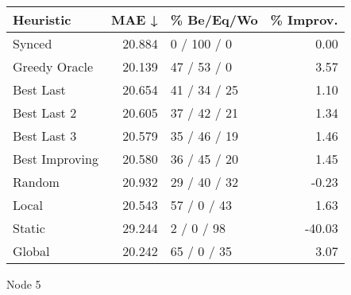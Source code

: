\begin{tabular}{lrlr}
\toprule
\textbf{Heuristic} & \textbf{MAE ↓} & \textbf{\% Be/Eq/Wo} & \textbf{\% Improv.} \\
\midrule
            Synced &         20.884 &          0 / 100 / 0 &                0.00 \\
     Greedy Oracle &         20.139 &          47 / 53 / 0 &                3.57 \\
         Best Last &         20.654 &         41 / 34 / 25 &                1.10 \\
       Best Last 2 &         20.605 &         37 / 42 / 21 &                1.34 \\
       Best Last 3 &         20.579 &         35 / 46 / 19 &                1.46 \\
    Best Improving &         20.580 &         36 / 45 / 20 &                1.45 \\
            Random &         20.932 &         29 / 40 / 32 &               -0.23 \\
             Local &         20.543 &          57 / 0 / 43 &                1.63 \\
            Static &         29.244 &           2 / 0 / 98 &              -40.03 \\
            Global &         20.242 &          65 / 0 / 35 &                3.07 \\
\bottomrule
\end{tabular}
\caption{Node 5}
\label{tab:non_lr05_le1_bs4_5}
